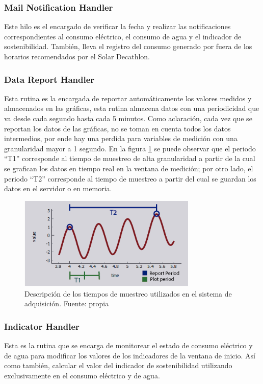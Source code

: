 \subsubsection{Mail Notification Handler}

Este hilo es el encargado de verificar la fecha y realizar las notificaciones correspondientes al consumo eléctrico, el consumo de agua y el indicador de sostenibilidad. También, lleva el registro del consumo generado por fuera de los horarios recomendados por el Solar Decathlon.

\subsubsection{Data Report Handler}

Esta rutina es la encargada de reportar automáticamente los valores medidos y almacenados en las gráficas, esta rutina almacena datos con una periodicidad que va desde  cada segundo hasta cada 5 minutos. Como aclaración, cada vez que se reportan los datos de las gráficas, no se toman en cuenta todos los datos intermedios, por ende hay una perdida para variables de medición con una granularidad mayor a 1 segundo. En la figura \ref{fig_34} se puede observar que el periodo ``T1'' corresponde al tiempo de muestreo de alta granularidad a partir de la cual se grafican los datos en tiempo real en la ventana de medición; por otro lado, el periodo ``T2'' corresponde al tiempo de muestreo a partir del cual se guardan los datos en el servidor o en memoria.
\begin{figure}[htbp]
	\centerline{\includegraphics[width=8.5cm]{figuras/graph_explanation.png}}
	\caption{Descripción de los tiempos de muestreo utilizados en el sistema de adquisición. Fuente: propia}
	\label{fig_34}
\end{figure}

\subsubsection{Indicator Handler}

Esta es la rutina que se encarga de monitorear el estado de consumo eléctrico y de agua para modificar los valores de los indicadores de la ventana de inicio. Así como también, calcular el valor del indicador de sostenibilidad utilizando exclusivamente en el consumo eléctrico y de agua.


 
